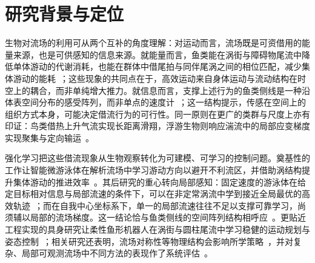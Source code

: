 
\section{研究背景与定位}\label{sec:ch5_related}

生物对流场的利用可从两个互补的角度理解：对运动而言，流场既是可资借用的能量来源，也是可供感知的信息来源。就能量而言，鱼类能在涡街与障碍物尾流中降低单体游动的代谢消耗，也能在群体中借尾拍与同伴尾涡之间的相位匹配，减少集体游动的能耗~\citep{liao2022efficiency,disanto2025smarter,li2020vortexphase}；这些现象的共同点在于，高效运动来自身体运动与流动结构在时空上的耦合，而非单纯增大推力。就信息而言，支撑上述行为的鱼类侧线是一种沿体表空间分布的感受阵列，而非单点的速度计~\citep{coombs2020rheotaxis}；这一结构提示，传感在空间上的组织方式本身，可能决定借流行为的可行性。同一原则在更广的类群与尺度上亦有印证：鸟类借热上升气流实现长距离滑翔，浮游生物则响应湍流中的局部应变梯度实现聚集与定向输运~\citep{flato2024soaring,mousavi2024zooplankton}。

强化学习把这些借流现象从生物观察转化为可建模、可学习的控制问题。奠基性的工作让智能微游泳体在解析流场中学习游动方向以避开不利流区，并借助涡结构提升集体游动的推进效率~\citep{colabrese2017flownav,verma2018pnas}。其后研究的重心转向局部感知：固定速度的游泳体在给定目标相对信息与局部流速的条件下，可以在非定常涡流中学到接近全局最优的高效轨迹~\citep{gunnarson2021ncomm}；而在自我中心坐标系下，单一的局部流速往往不足以支撑可靠学习，尚须辅以局部的流场梯度。这一结论恰与鱼类侧线的空间阵列结构相呼应~\citep{jiao2025gradients}。更贴近工程实现的具身研究让柔性鱼形机器人在涡街与圆柱尾流中学习稳健的运动规划与姿态控制~\citep{zhu2022fishlike,feng2025roboticfish}；相关研究还表明，流场对称性等物理结构会影响所学策略~\citep{qiu2022symmetries}，并对复杂、局部可观测流场中不同方法的表现作了系统评估~\citep{mecanna2025assessment}。

